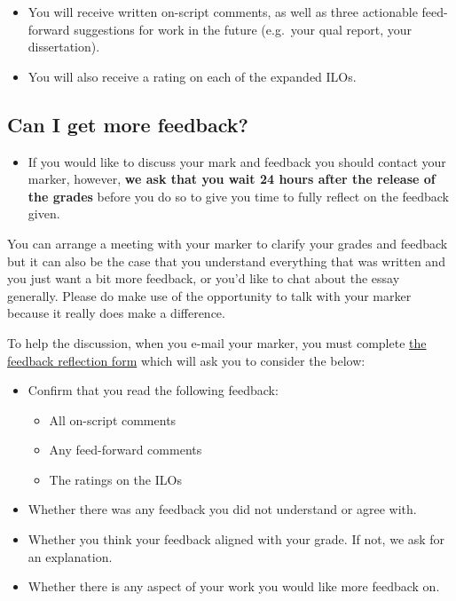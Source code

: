 \documentclass[
  english,
  letterpaper,
  DIV=11,
  numbers=noendperiod]{scrreprt}
\providecommand{\tightlist}{%
  \setlength{\itemsep}{0pt}\setlength{\parskip}{0pt}}
\begin{document}
\begin{itemize}
\item
  You will receive written on-script comments, as well as three
  actionable feed-forward suggestions for work in the future (e.g.~your
  qual report, your dissertation).
\item
  You will also receive a rating on each of the expanded ILOs.
\end{itemize}

\subsection{Can I get more feedback?}\label{can-i-get-more-feedback-1}

\begin{itemize}
\tightlist
\item
  If you would like to discuss your mark and feedback you should contact
  your marker, however, \textbf{we ask that you wait 24 hours after the
  release of the grades} before you do so to give you time to fully
  reflect on the feedback given.
\end{itemize}

You can arrange a meeting with your marker to clarify your grades and
feedback but it can also be the case that you understand everything that
was written and you just want a bit more feedback, or you'd like to chat
about the essay generally. Please do make use of the opportunity to talk
with your marker because it really does make a difference.

To help the discussion, when you e-mail your marker, you must complete
\href{https://gla-my.sharepoint.com/:w:/g/personal/ashley_robertson_glasgow_ac_uk/EanCqf_RV7pMumQt1Bm0N4YB3RlzoIjP9kmbe0qbYj9rYQ?e=MDWxPP}{the
feedback reflection form} which will ask you to consider the below:

\begin{itemize}
\tightlist
\item
  Confirm that you read the following feedback:

  \begin{itemize}
  \tightlist
  \item
    All on-script comments
  \item
    Any feed-forward comments
  \item
    The ratings on the ILOs
  \end{itemize}
\item
  Whether there was any feedback you did not understand or agree with.
\item
  Whether you think your feedback aligned with your grade. If not, we
  ask for an explanation.
\item
  Whether there is any aspect of your work you would like more feedback
  on.
\end{itemize}
\end{document}
